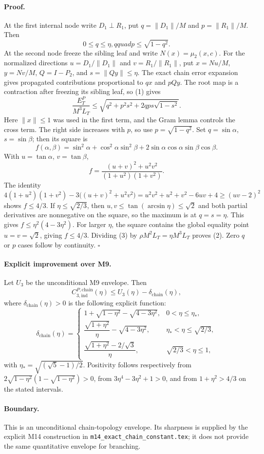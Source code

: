 \paragraph{Proof.}
At the first internal node write $D_1\perp R_1$, put
$q=\|D_1\|/M$ and $p=\|R_1\|/M$.  Then
\[
 0\le q\le\eta,qquad p\le\sqrt{1-q^2}.
\]
At the second node freeze the sibling leaf and write
$N(x)=\mu_2(x,c)$.  For the normalized directions
$u=D_1/\|D_1\|$ and $v=R_1/\|R_1\|$, put
$x=N u/M$, $y=N v/M$, $Q=I-P_2$, and
$s=\|Qy\|\le\eta$.  The exact chain error expansion gives propagated
contributions proportional to $q x$ and $pQy$.  The root map is a contraction
after freezing its sibling leaf, so (1) gives
\[
 \frac{E_T^P}{M^3L_T}
 \le
 \sqrt{q^2+p^2s^2+2qps\sqrt{1-s^2}}.
\tag{3}
\]
Here $\|x\|\le1$ was used in the first term, and the Gram lemma controls the
cross term.  The right side increases with $p$, so use
$p=\sqrt{1-q^2}$.  Set $q=\sin\alpha$, $s=\sin\beta$; then its square is
\[
 f(\alpha,\beta)=\sin^2\alpha+\cos^2\alpha\sin^2\beta
 +2\sin\alpha\cos\alpha\sin\beta\cos\beta.
\]
With $u=\tan\alpha$, $v=\tan\beta$,
\[
 f=\frac{(u+v)^2+u^2v^2}{(1+u^2)(1+v^2)}.
\]
The identity
\[
 4(1+u^2)(1+v^2)-3\big((u+v)^2+u^2v^2\big)
 =u^2v^2+u^2+v^2-6uv+4
 \ge(uv-2)^2
\]
shows $f\le4/3$.  If
$\eta\le\sqrt{2/3}$, then
$u,v\le\tan(\arcsin\eta)\le\sqrt2$ and both partial derivatives are
nonnegative on the square, so the maximum is at $q=s=\eta$.  This gives
$f\le\eta^2(4-3\eta^2)$.  For larger $\eta$, the square contains the
global equality point $u=v=\sqrt2$, giving $f\le4/3$.  Dividing (3) by
$\rho M^2L_T=\eta M^3L_T$ proves (2).  Zero $q$ or $p$ cases follow by
continuity. $\square$

\paragraph{Explicit improvement over M9.}
Let $U_3$ be the unconditional M9 envelope.  Then
\[
 C_{3,\mathrm{ind}}^{P,\mathrm{chain}}(\eta)
 \le U_3(\eta)-\delta_{\mathrm{chain}}(\eta),
\]
where $\delta_{\mathrm{chain}}(\eta)>0$ is the following explicit function:
\[
\delta_{\mathrm{chain}}(\eta)=
\begin{cases}
1+\sqrt{1-\eta^2}-\sqrt{4-3\eta^2},
 &0<\eta\le\eta_*,\\[1mm]
\dfrac{\sqrt{1+\eta^2}}{\eta}-\sqrt{4-3\eta^2},
 &\eta_*<\eta\le\sqrt{2/3},\\[3mm]
\dfrac{\sqrt{1+\eta^2}-2/\sqrt3}{\eta},
 &\sqrt{2/3}<\eta\le1,
\end{cases}
\]
with $\eta_*=\sqrt{(\sqrt5-1)/2}$.  Positivity follows respectively from
$2\sqrt{1-\eta^2}(1-\sqrt{1-\eta^2})>0$, from
$3\eta^4-3\eta^2+1>0$, and from
$1+\eta^2>4/3$ on the stated intervals.

\paragraph{Boundary.}
This is an unconditional chain-topology envelope.  Its sharpness is supplied
by the explicit M14 construction in
\texttt{m14\_exact\_chain\_constant.tex}; it does not provide the same
quantitative envelope for branching.
